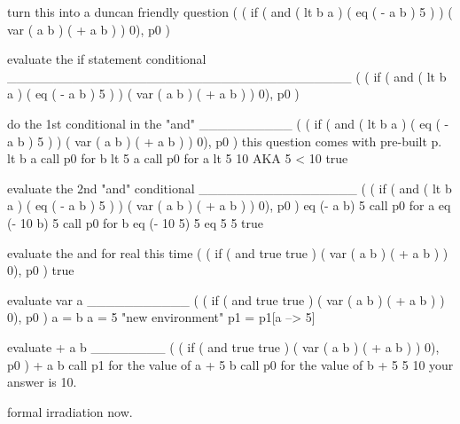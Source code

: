 \documentclass[11pt]{article}
\begin{document}
\begin{enumerate}
        \begin{markdown}
            turn this into a duncan friendly question
            ( ( if ( and ( lt b a ) ( eq ( - a b ) 5 ) ) ( var ( a b ) ( + a b ) ) 0), p0 )

            evaluate the if statement conditional
            _____________________________________
            ( ( if ( and ( lt b a ) ( eq ( - a b ) 5 ) ) ( var ( a b ) ( + a b ) ) 0), p0 )

            do the 1st conditional in the "and"
            __________
            ( ( if ( and ( lt b a ) ( eq ( - a b ) 5 ) ) ( var ( a b ) ( + a b ) ) 0), p0 )
            this question comes with pre-built p.
            lt b a
            call p0 for b
            lt 5 a
            call p0 for a
            lt 5 10
            AKA
            5 < 10
            true

            evaluate the 2nd "and" conditional
            _________________
            ( ( if ( and ( lt b a ) ( eq ( - a b ) 5 ) ) ( var ( a b ) ( + a b ) ) 0), p0 )
            eq (- a b) 5
            call p0 for a
            eq (- 10 b) 5
            call p0 for b
            eq (- 10 5) 5
            eq 5 5
            true

            evaluate the and for real this time
            ( ( if ( and true true ) ( var ( a b ) ( + a b ) ) 0), p0 )
            true

            evaluate var a
            ___________
            ( ( if ( and true true ) ( var ( a b ) ( + a b ) ) 0), p0 )
            a = b
            a = 5
            "new environment"
            p1 = p1[a --> 5]

            evaluate + a b
            ________
            ( ( if ( and true true ) ( var ( a b ) ( + a b ) ) 0), p0 )
            + a b
            call p1 for the value of a
            + 5 b
            call p0 for the value of b
            + 5 5
            10
            your answer is 10.

            formal irradiation now.
        \end{markdown}


\end{enumerate}
\end{document}
